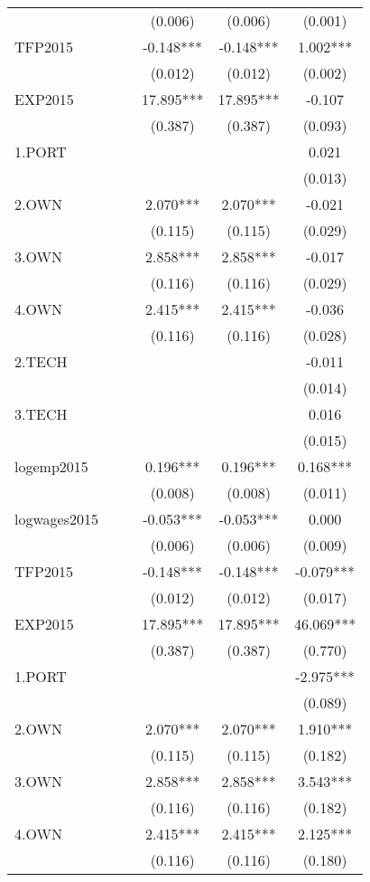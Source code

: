 \documentclass[]{article}
\begin{document}
\begin{tabular}{lccccc}
 &  &  & (0.006) & (0.006) & (0.001) \\
TFP2015 &  &  & -0.148*** & -0.148*** & 1.002*** \\
 &  &  & (0.012) & (0.012) & (0.002) \\
EXP2015 &  &  & 17.895*** & 17.895*** & -0.107 \\
 &  &  & (0.387) & (0.387) & (0.093) \\
1.PORT &  &  &  &  & 0.021 \\
 &  &  &  &  & (0.013) \\
2.OWN &  &  & 2.070*** & 2.070*** & -0.021 \\
 &  &  & (0.115) & (0.115) & (0.029) \\
3.OWN &  &  & 2.858*** & 2.858*** & -0.017 \\
 &  &  & (0.116) & (0.116) & (0.029) \\
4.OWN &  &  & 2.415*** & 2.415*** & -0.036 \\
 &  &  & (0.116) & (0.116) & (0.028) \\
2.TECH &  &  &  &  & -0.011 \\
 &  &  &  &  & (0.014) \\
3.TECH &  &  &  &  & 0.016 \\
 &  &  &  &  & (0.015) \\
logemp2015 &  &  & 0.196*** & 0.196*** & 0.168*** \\
 &  &  & (0.008) & (0.008) & (0.011) \\
logwages2015 &  &  & -0.053*** & -0.053*** & 0.000 \\
 &  &  & (0.006) & (0.006) & (0.009) \\
TFP2015 &  &  & -0.148*** & -0.148*** & -0.079*** \\
 &  &  & (0.012) & (0.012) & (0.017) \\
EXP2015 &  &  & 17.895*** & 17.895*** & 46.069*** \\
 &  &  & (0.387) & (0.387) & (0.770) \\
1.PORT &  &  &  &  & -2.975*** \\
 &  &  &  &  & (0.089) \\
2.OWN &  &  & 2.070*** & 2.070*** & 1.910*** \\
 &  &  & (0.115) & (0.115) & (0.182) \\
3.OWN &  &  & 2.858*** & 2.858*** & 3.543*** \\
 &  &  & (0.116) & (0.116) & (0.182) \\
4.OWN &  &  & 2.415*** & 2.415*** & 2.125*** \\
 &  &  & (0.116) & (0.116) & (0.180) \\

\end{tabular}
\end{document}
